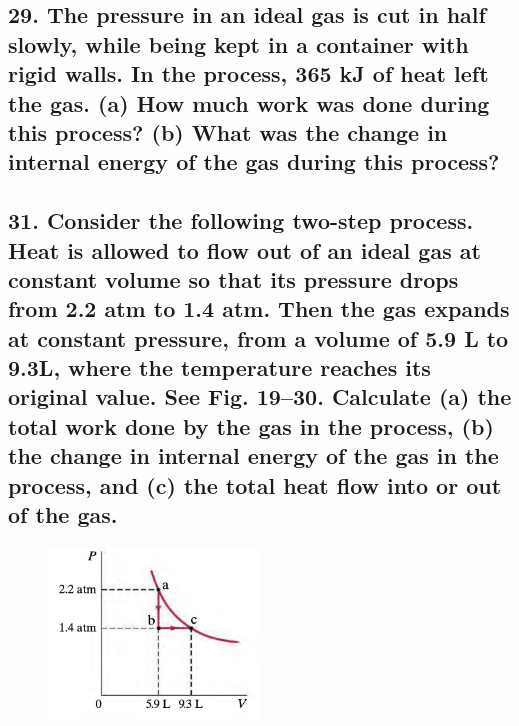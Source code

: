 \documentclass{article}
\begin{document}
    \subsection*{29. The pressure in an ideal gas is cut in half slowly, while being kept in a container with rigid walls. In the process, 365 kJ of heat left the gas. (a) How much work was done during this process? (b) What was the change in internal energy of the gas during this process?}
    \vspace{4in}
    \subsection*{31. Consider the following two-step process. Heat is allowed to flow out of an ideal gas at constant volume so that its pressure drops from 2.2 atm to 1.4 atm. Then the gas expands at constant pressure, from a volume of 5.9 L to 9.3L, where the temperature reaches its original value. See Fig. 19–30. Calculate (a) the total work done by the gas in the process,
(b) the change in internal energy of the gas in the process, and (c) the total heat flow into or out of the gas.}
    \begin{figure}[h]
        \begin{center}
            \includegraphics[width=0.5\textwidth]{figures/fig19-30.jpg}
        \end{center}
    \end{figure}
    \vspace{4in}
\end{document}
